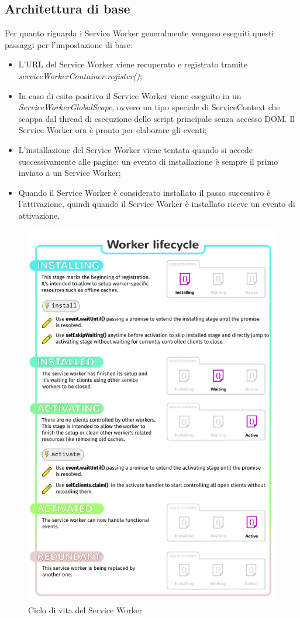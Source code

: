 \documentclass[11pt ,a4paper , twoside , openright ]{book}
\begin{document}
	\subsection{Architettura di base}
	Per quanto riguarda i Service Worker generalmente vengono eseguiti questi passaggi per l'impostazione di base:
	\begin{itemize}
		\item L'URL del Service Worker viene recuperato e registrato tramite \textit{serviceWorkerContainer.register()};
		\item In caso di esito positivo il Service Worker viene eseguito in un \textit{ServiceWorkerGlobalScope}, ovvero un tipo speciale di ServiceContext che scappa dal thread di esecuzione dello script principale senza accesso DOM. Il Service Worker ora è pronto per elaborare gli eventi;
		\item L'installazione del Service Worker viene tentata quando si accede successivamente alle pagine: un evento di installazione è sempre il primo inviato a un Service Worker;
		\item Quando il Service Worker è considerato installato il passo successivo è l'attivazione, quindi quando il Service Worker è installato riceve un evento di attivazione.
	\end{itemize}
	\begin{figure}[h]
		\centering
		\includegraphics[width=0.6\linewidth]{SwLifecycle}
		\caption{Ciclo di vita del Service Worker}
		\label{fig:Ciclo di vita del Service Worker}
	\end{figure}
	
\end{document}
